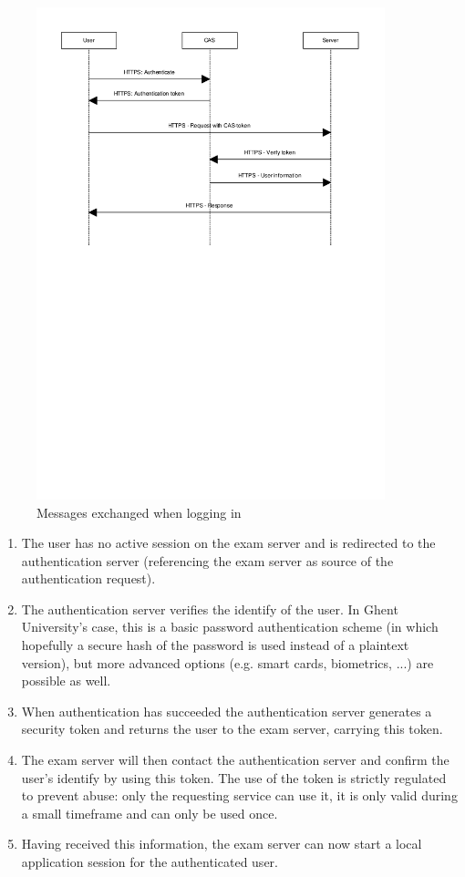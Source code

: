 \documentclass{article}
\begin{document}
\begin{figure}[ht]
  \begin{center}
  \includegraphics[width=0.9\textwidth]{images/login.pdf}
  \caption{Messages exchanged when logging in}
  \label{fig:login}
  \end{center}
\end{figure}

\begin{enumerate}
\item The user has no active session on the exam server and is redirected
  to the authentication server (referencing the exam server as source of the
  authentication request).
\item The authentication server verifies the identify of the user. In Ghent
  University's case, this is a basic password authentication scheme (in which
  hopefully a secure hash of the password is used instead of a plaintext
  version), but more advanced options (e.g. smart cards, biometrics, ...) are
  possible as well.
\item When authentication has succeeded the authentication server generates
  a security token and returns the user to the exam server, carrying this token.
\item The exam server will then contact the authentication server and confirm
  the user's identify by using this token. The use of the token is strictly
  regulated to prevent abuse: only the requesting service can use it, it is only
  valid during a small timeframe and can only be used once.
\item Having received this information, the exam server can now start a local
  application session for the authenticated user.
\end{enumerate}
\end{document}
